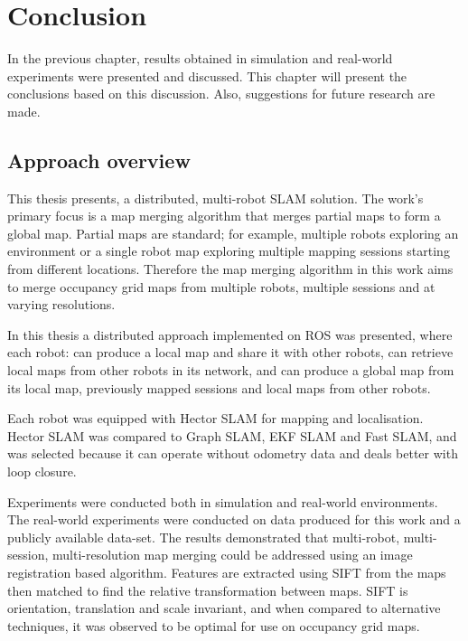 \chapter{Conclusion}
\label{ch:conclusion}

In the previous chapter, results obtained in simulation and real-world experiments were presented and discussed. This chapter will present the conclusions based on this discussion. Also, suggestions for future research are made.


\section{Approach overview}

This thesis presents, a distributed, multi-robot SLAM solution. The work's primary focus is a map merging algorithm that merges partial maps to form a global map. Partial maps are standard; for example, multiple robots exploring an environment or a single robot map exploring multiple mapping sessions starting from different locations. Therefore the map merging algorithm in this work aims to merge occupancy grid maps from multiple robots, multiple sessions and at varying resolutions. 

In this thesis a distributed approach implemented on ROS was presented, where each robot: can produce a local map and share it with other robots, can retrieve local maps from other robots in its network, and can produce a global map from its local map, previously mapped sessions and local maps from other robots. 

Each robot was equipped with Hector SLAM for mapping and localisation. Hector SLAM was compared to Graph SLAM, EKF SLAM and Fast SLAM, and was selected because it can operate without odometry data and deals better with loop closure.

Experiments were conducted both in simulation and real-world environments. The real-world experiments were conducted on data produced for this work and a publicly available data-set. The results demonstrated that multi-robot, multi-session, multi-resolution map merging could be addressed using an image registration based algorithm. Features are extracted using SIFT from the maps then matched to find the relative transformation between maps. SIFT is orientation, translation and scale invariant, and when compared to alternative techniques, it was observed to be optimal for use on occupancy grid maps. 

